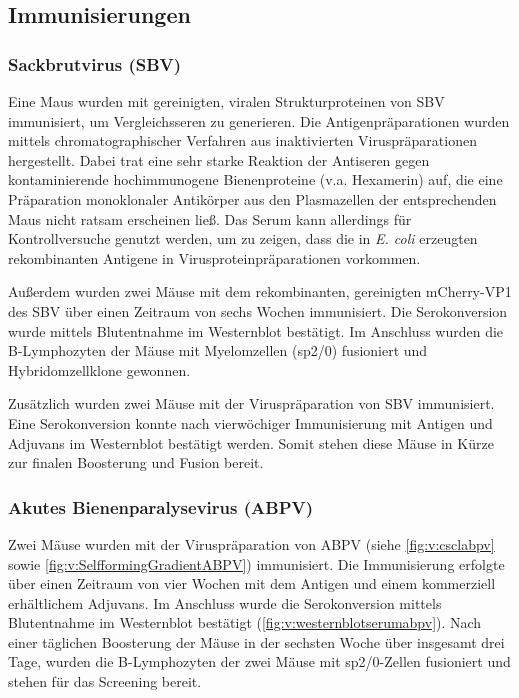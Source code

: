 \subsection{Immunisierungen}
\subsubsection{Sackbrutvirus (SBV)}
Eine Maus wurden mit gereinigten, viralen Strukturproteinen von SBV immunisiert, um Vergleichsseren zu generieren. Die Antigenpräparationen wurden mittels chromatographischer Verfahren aus inaktivierten Viruspräparationen hergestellt. Dabei trat eine sehr starke Reaktion der Antiseren gegen kontaminierende hochimmunogene Bienenproteine (v.a. Hexamerin) auf, die eine Präparation monoklonaler Antikörper aus den Plasmazellen der entsprechenden Maus nicht ratsam erscheinen ließ. Das Serum kann allerdings für Kontrollversuche genutzt werden, um zu zeigen, dass die in \textit{E. coli} erzeugten rekombinanten Antigene in Virusproteinpräparationen vorkommen.

Außerdem wurden zwei Mäuse mit dem rekombinanten, gereinigten mCherry-VP1 des SBV über einen Zeitraum von sechs Wochen immunisiert. Die Serokonversion wurde mittels Blutentnahme im Westernblot bestätigt. Im Anschluss wurden die B-Lymphozyten der Mäuse mit Myelomzellen (sp2/0) fusioniert und Hybridomzellklone gewonnen.

Zusätzlich wurden zwei Mäuse mit der Viruspräparation von SBV immunisiert. Eine Serokonversion konnte nach vierwöchiger Immunisierung mit Antigen und Adjuvans im Westernblot bestätigt werden. Somit stehen diese Mäuse in Kürze zur finalen Boosterung und Fusion bereit.

\subsubsection{Akutes Bienenparalysevirus (ABPV)}

Zwei Mäuse wurden mit der Viruspräparation von ABPV (siehe \cref{fig:v:csclabpv} sowie \cref{fig:v:SelfformingGradientABPV}) immunisiert. Die Immunisierung erfolgte über einen Zeitraum von vier Wochen mit dem Antigen und einem kommerziell erhältlichem Adjuvans. Im Anschluss wurde die Serokonversion mittels Blutentnahme im Westernblot bestätigt (\cref{fig:v:westernblotserumabpv}). Nach einer täglichen Boosterung der Mäuse in der sechsten Woche über insgesamt drei Tage, wurden die B-Lymphozyten der zwei Mäuse mit sp2/0-Zellen fusioniert und stehen für das Screening bereit.

